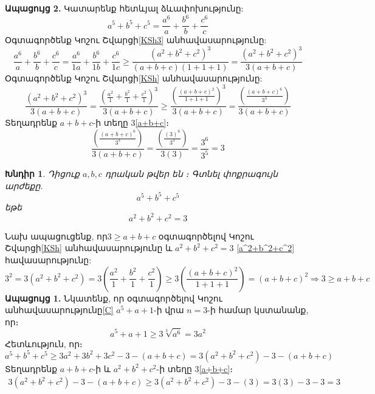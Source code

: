 \documentclass{article}
\newtheorem{problem}{Խնդիր}
\numberwithin{equation}
\begin{document}
\textbf{Ապացույց 2.}
Կատարենք հետևյալ ձևափոխությունը:
\begin{equation}
 a^5+b^5+c^5=\frac{a^6}{a}+\frac{b^6}{b}+\frac{c^6}{c}
\end{equation}
Օգտագործենք Կոշու Շվարցի\eqref{KSh3} անհավասարությունը:
\begin{equation}
 \frac{a^6}{a}+\frac{b^6}{b}+\frac{c^6}{c}=\frac{a^6}{1a}+\frac{b^6}{1b}+\frac{c^6}{1c}\ge\frac{(a^2+b^2+c^2)^3}{(a+b+c)(1+1+1)} = \frac{(a^2+b^2+c^2)^3}{3(a+b+c)}
\end{equation}
Օգտագործենք Կոշու Շվարցի\eqref{KSh} անհավասարությունը:
\begin{equation}
 \frac{(a^2+b^2+c^2)^3}{3(a+b+c)}=\frac{(\frac{a^2}{1}+\frac{b^2}{1}+\frac{c^2}{1})^3}{3(a+b+c)}\ge\frac{(\frac{(a+b+c)^2}{1+1+1})^3}{3(a+b+c)}=\frac{(\frac{(a+b+c)^6}{3^3})}{3(a+b+c)}
\end{equation}
Տեղադրենք $a+b+c$-ի տեղը 3\eqref{a+b+c}։
\begin{equation}
 \frac{(\frac{(a+b+c)^6}{3^3})}{3(a+b+c)}=\frac{(\frac{(3)^6}{3^3})}{3(3)}=\frac{3^6}{3^5}=3
\end{equation}

\begin{problem}
Դիցուք $a,b,c$ դրական թվեր են ։ Գտնել փոքրագույն արժեքը.
\begin{equation}
 a^5+b^5+c^5    
\end{equation}
եթե
\begin{equation}\label{a^2+b^2+c^2}
a^2+b^2+c^2=3 
\end{equation}
\end{problem}
Նախ ապացուցենք, որ$3\ge a+b+c$ օգտագործելով Կոշու Շվարցի\eqref{KSh} անհավասարությունը և $a^2+b^2+c^2=3$ \eqref{a^2+b^2+c^2} հավասարությունը:
\begin{equation}\label{a+b+c<=3}
3^2=3(a^2+b^2+c^2)=3(\frac{a^2}{1}+\frac{b^2}{1}+\frac{c^2}{1})\ge 3(\frac{(a+b+c)^2}{1+1+1})=(a+b+c)^2\Rightarrow3\ge a+b+c
\end{equation}
\textbf{Ապացույց 1.}
Նկատենք, որ օգտագործելով Կոշու անհավասարությունը\eqref{C} $a^5+a+1$-ի վրա $n=3$-ի համար կստանանք, որ։
\begin{equation}
a^5+a+1 \ge 3\sqrt[3]{a^6} = 3a^2
\end{equation}
Հետևություն, որ։
\begin{equation}
a^5+b^5+c^5 \ge 3a^2+3b^2+3c^2-3-(a+b+c)=3(a^2+b^2+c^2)-3-(a+b+c)
\end{equation}
Տեղադրենք $a+b+c$-ի և $a^2+b^2+c^2$-ի տեղը 3\eqref{a+b+c}։
\begin{align}
3(a^2+b^2+c^2)-3-(a+b+c) \ge 3(a^2+b^2+c^2)-3-(3)=3(3)-3-3=3
\end{align}
\end{document}
